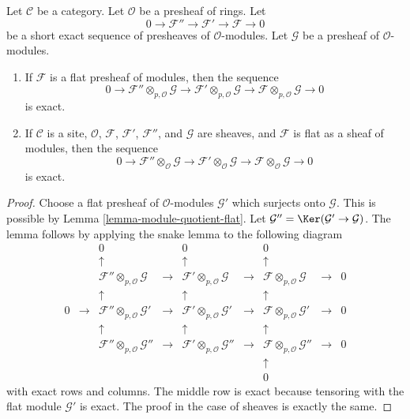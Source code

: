 \begin{lemma}
\label{lemma-flat-tor-zero}
Let $\mathcal{C}$ be a category.
Let $\mathcal{O}$ be a presheaf of rings.
Let
$$
0 \to \mathcal{F}'' \to \mathcal{F}' \to \mathcal{F} \to 0
$$
be a short exact sequence of presheaves of $\mathcal{O}$-modules.
Let $\mathcal{G}$ be a presheaf of $\mathcal{O}$-modules.
\begin{enumerate}
\item If $\mathcal{F}$ is a flat presheaf of modules, then
the sequence
$$
0 \to
\mathcal{F}'' \otimes_{p, \mathcal{O}} \mathcal{G} \to
\mathcal{F}' \otimes_{p, \mathcal{O}} \mathcal{G} \to
\mathcal{F} \otimes_{p, \mathcal{O}} \mathcal{G} \to 0
$$
is exact.
\item If $\mathcal{C}$ is a site, $\mathcal{O}$,
$\mathcal{F}$, $\mathcal{F}'$, $\mathcal{F}''$, and
$\mathcal{G}$ are sheaves, and $\mathcal{F}$ is flat
as a sheaf of modules, then the sequence
$$
0 \to
\mathcal{F}'' \otimes_\mathcal{O} \mathcal{G} \to
\mathcal{F}' \otimes_\mathcal{O} \mathcal{G} \to
\mathcal{F} \otimes_\mathcal{O} \mathcal{G} \to 0
$$
is exact.
\end{enumerate}
\end{lemma}

\begin{proof}
Choose a flat presheaf of $\mathcal{O}$-modules $\mathcal{G}'$
which surjects onto $\mathcal{G}$. This is possible by
Lemma \ref{lemma-module-quotient-flat}. Let
$\mathcal{G}'' = \Ker(\mathcal{G}' \to \mathcal{G})$.
The lemma follows by applying the snake lemma to the following
diagram
$$
\begin{matrix}
 & & 0 & & 0 & & 0 & & \\
 & & \uparrow & & \uparrow & & \uparrow & & \\
 & & \mathcal{F}'' \otimes_{p, \mathcal{O}} \mathcal{G} & \to &
     \mathcal{F}' \otimes_{p, \mathcal{O}} \mathcal{G} & \to &
     \mathcal{F} \otimes_{p, \mathcal{O}} \mathcal{G} & \to & 0 \\
 & & \uparrow & & \uparrow & & \uparrow & & \\
0 & \to & \mathcal{F}'' \otimes_{p, \mathcal{O}} \mathcal{G}' & \to &
          \mathcal{F}' \otimes_{p, \mathcal{O}} \mathcal{G}' & \to &
          \mathcal{F} \otimes_{p, \mathcal{O}} \mathcal{G}' & \to & 0 \\
 & & \uparrow & & \uparrow & & \uparrow & & \\
 & & \mathcal{F}'' \otimes_{p, \mathcal{O}} \mathcal{G}'' & \to &
     \mathcal{F}' \otimes_{p, \mathcal{O}} \mathcal{G}'' & \to &
     \mathcal{F} \otimes_{p, \mathcal{O}} \mathcal{G}'' & \to & 0 \\
 & & & & & & \uparrow & & \\
 & & & & & & 0 & &
\end{matrix}
$$
with exact rows and columns. The middle row is exact because tensoring
with the flat module $\mathcal{G}'$ is exact. The proof in the case
of sheaves is exactly the same.
\end{proof}

